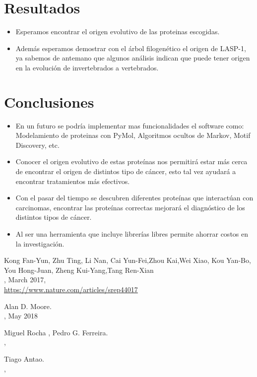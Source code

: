 \documentclass[twocolumn,twoside,12pt]{article}
\begin{document}
\normalsize
\section{Resultados}
\begin{itemize}
	\item Esperamos encontrar el origen evolutivo de las proteinas escogidas.
	    
    \item Adem\'as esperamos demostrar con el \'arbol filogen\'etico el origen de LASP-1, ya sabemos de antemano que algunos an\'alisis indican que puede tener origen en la evoluci\'on de invertebrados a vertebrados.	
    
\end{itemize}

\section{Conclusiones}

\begin{itemize}
\item En un futuro se podr\'ia implementar mas funcionalidades el software como: Modelamiento de proteinas con PyMol, Algoritmos ocultos de Markov, Motif Discovery, etc.
\item Conocer el origen evolutivo de estas prote\'inas nos permitir\'a estar m\'as cerca de encontrar el origen de  distintos tipo de c\'ancer, esto tal vez ayudar\'a a encontrar tratamientos m\'as efectivos.
\item Con el pasar del tiempo se descubren diferentes prote\'inas que interact\'uan con carcinomas, encontrar las prote\'inas correctas mejorar\'a el diagn\'ostico de los distintos tipos de c\'ancer.
\item Al ser una herramienta que incluye librer\'ias libres permite ahorrar costos en la investigaci\'on.  

\end{itemize}


\begin{thebibliography}{X}

	Kong Fan-Yun, Zhu Ting, Li Nan, Cai Yun-Fei,Zhou Kai,Wei Xiao, Kou Yan-Bo, You Hong-Juan, Zheng   
	Kui-Yang,Tang Ren-Xian\\
,
 March 2017,\\
\url{https://www.nature.com/articles/srep44017}

	Alan D. Moore.\\
,
\newblock May 2018

    
	Miguel Rocha , Pedro G. Ferreira.\\
,
	
	
   Tiago Antao.\\
,


	
\end{thebibliography}
\end{document}
